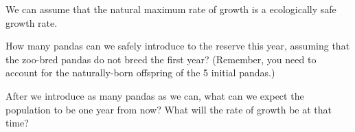 \documentclass{letter}
\begin{document}
    We can assume that the natural maximum rate of growth is a
    ecologically safe growth rate.

    \begin{problem}{}
      How many pandas can we safely introduce to the reserve this year,
      assuming that the zoo-bred pandas do not breed the first year?
      (Remember, you need to account for the naturally-born offspring
      of the 5 initial pandas.)
    \end{problem}

    \begin{problem}{}
      After we introduce as many pandas as we can, what can we expect
      the population to be one year from now? What will the rate of
      growth be at that time?
    \end{problem}
\end{document}
